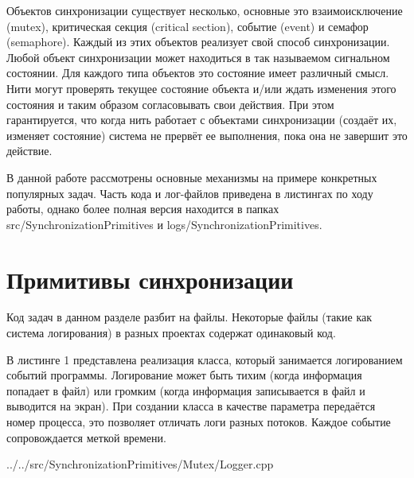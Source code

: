 \documentclass[a4paper, 12pt]{article}		%
\begin{document}
Объектов синхронизации существует несколько, основные это взаимоисключение (mutex), критическая секция (critical section), событие (event) и семафор (semaphore). Каждый из этих объектов реализует свой способ синхронизации. Любой объект синхронизации может находиться в так называемом сигнальном состоянии. Для каждого типа объектов это состояние имеет различный смысл. Нити могут проверять текущее состояние объекта и/или ждать изменения этого состояния и таким образом согласовывать свои действия. При этом гарантируется, что когда нить работает с объектами синхронизации (создаёт их, изменяет состояние) система не прервёт ее выполнения, пока она не завершит это действие. 

В данной работе рассмотрены основные механизмы на примере конкретных популярных задач. Часть кода и лог-файлов приведена в листингах по ходу работы, однако более полная версия находится в папках src/SynchronizationPrimitives и logs/SynchronizationPrimitives.

\newpage
\section{Примитивы синхронизации}

Код задач в данном разделе разбит на файлы. Некоторые файлы (такие как система логирования) в разных проектах содержат одинаковый код.

В листинге 1 представлена реализация класса, который занимается логированием событий программы. Логирование может быть тихим (когда информация попадает в файл) или громким (когда информация записывается в файл и выводится на экран). При создании класса в качестве параметра передаётся номер процесса, это позволяет отличать логи разных потоков. Каждое событие сопровождается меткой времени.


{../../src/SynchronizationPrimitives/Mutex/Logger.cpp}
\end{document}
